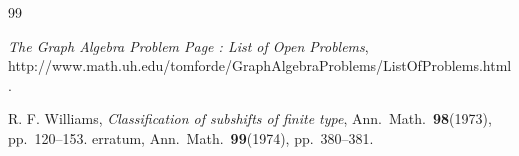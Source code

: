 \documentclass[11pt]{article}
\theoremstyle{plain}
\theoremstyle{definition}
\numberwithin{equation}{section}
\begin{document}
\begin{thebibliography}{99}

{\it The Graph Algebra Problem Page : List of Open Problems},
http://www.math.uh.edu/tomforde/GraphAlgebraProblems/ListOfProblems.html.


















 {\sc R. F. Williams},
{\it Classification of subshifts of finite type}, 
 Ann.\ Math.\  {\bf 98}(1973), pp.\ 120--153.
 erratum, Ann.\ Math.\
{\bf 99}(1974), pp.\ 380--381.

\end{thebibliography}
\end{document}
